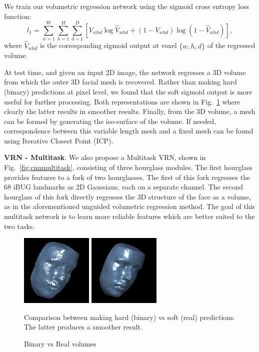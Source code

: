 We train our volumetric regression network using the sigmoid cross entropy loss function:
\begin{equation}
  l_{1} = \sum\limits_{w=1}^{W} \sum\limits_{h=1}^{H}\sum\limits_{d=1}^{D}[V_{whd}\log \widehat{V}_{whd}+(1-V_{whd})\log(1-\widehat{V}_{whd})],
\end{equation}
where $\widehat{V}_{whd}$ is the corresponding sigmoid output at voxel $\{w,h,d\}$ of the regressed volume.

At test time, and given an input 2D image, the network regresses a 3D volume from which the outer 3D facial mesh is recovered. Rather than making hard (binary) predictions at pixel level, we found that the soft sigmoid output is more useful for further processing. Both
representations are shown in Fig.~\ref{fig:roughvssmooth} where
clearly the latter results in smoother results. Finally, from the 3D volume, a mesh can be formed by generating the iso-surface of the volume. If needed, correspondence between this variable length mesh and a fixed mesh can be found using Iterative Closest Point (ICP).

\textbf{VRN - Multitask}. We also propose a Multitask VRN, shown in Fig.~\ref{fig:cnnmultitask}, consisting of three hourglass modules. The first hourglass provides features to a fork of two hourglasses. The first of this fork regresses the 68 iBUG landmarks \cite{sagonas2013semi} as 2D Gaussians, each on a separate channel. The second hourglass of this fork directly regresses the 3D structure of the face as a volume, as in the aforementioned
unguided volumetric regression method. The goal of this multitask network is to learn more reliable features which are better suited to the two tasks.


\begin{figure}
  \centering
  \includegraphics[width=0.4\linewidth]{img/example_rough.png}
  \includegraphics[width=0.4\linewidth]{img/example_smooth.png}
  \caption{Binary vs Real volumes}{Comparison between making hard
    (binary) vs soft (real) predictions. The latter produces a
    smoother result.}
  \label{fig:roughvssmooth}
  \vspace{-4mm}
\end{figure}

